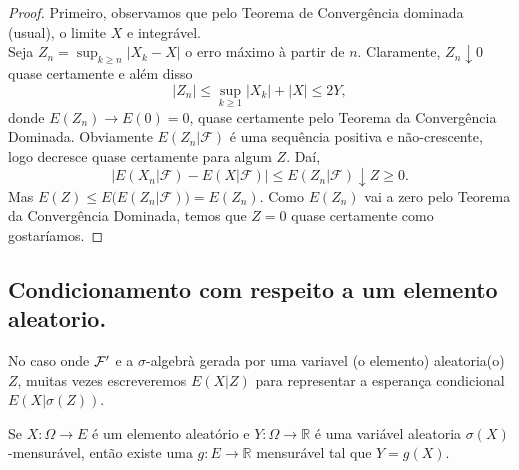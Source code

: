 \begin{proof}
Primeiro, observamos que pelo Teorema de Convergência dominada (usual), o limite $X$ e integrável.\\

Seja $Z_n = \sup_{k \geq n} |X_k - X|$ o erro máximo à partir de $n$.
Claramente, $Z_n \downarrow 0$ quase certamente e além disso
  \begin{equation}
    |Z_n| \leq \sup_{k \geq 1} |X_k| + |X| \leq 2 Y,
  \end{equation}
  donde $E(Z_n) \to E(0) = 0$, quase certamente pelo Teorema da Convergência Dominada.
Obviamente $E(Z_n|\mathcal{F})$ é uma sequência positiva e não-crescente, logo decresce quase certamente para algum $Z$.
  Daí,
  \begin{equation}
    \big| E(X_n | \mathcal{F}) - E(X | \mathcal{F}) \big| \leq E(Z_n | \mathcal{F}) \downarrow Z \geq 0.
  \end{equation}
  Mas $E(Z) \leq E\big( E(Z_n|\mathcal{F}) \big) = E(Z_n)$.
  Como $E(Z_n)$ vai a zero pelo Teorema da Convergência Dominada, temos que $Z = 0$ quase certamente como gostaríamos.
\end{proof}

\subsection{Condicionamento com respeito a um elemento aleatorio.}

No caso onde ${\mathcal F}'$ e a $\sigma$-algebrà gerada por uma variavel (o elemento) aleatoria(o) $Z$, muitas vezes escreveremos $E(X|Z)$ para representar a esperança condicional $E(X|\sigma(Z))$.


\begin{lemma}
  \label{l:f_g_circ_X}
  Se $X: \Omega \to E$ é um elemento aleatório e $Y:\Omega \to \mathbb{R}$ é uma variável aleatoria $\sigma(X)$-mensurável, 
  então existe uma $g:E \to \mathbb{R}$ mensurável tal que $Y = g(X)$.
\end{lemma}

